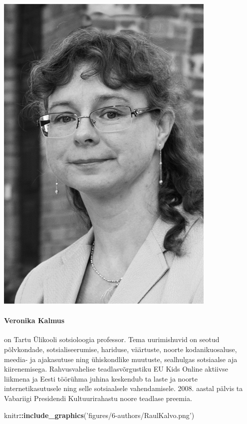 \documentclass[estonian,]{article}
\newenvironment{Shaded}{\begin{snugshade}}{\end{snugshade}}
\newcommand{\KeywordTok}[1]{\textcolor[rgb]{0.13,0.29,0.53}{\textbf{#1}}}
\newcommand{\NormalTok}[1]{#1}
\newcommand{\OperatorTok}[1]{\textcolor[rgb]{0.81,0.36,0.00}{\textbf{#1}}}
\newcommand{\StringTok}[1]{\textcolor[rgb]{0.31,0.60,0.02}{#1}}
\let\oldparagraph\paragraph
\renewcommand{\paragraph}[1]{\oldparagraph{#1}\mbox{}}
\begin{document}
\begin{flushleft}\includegraphics[width=0.5\linewidth]{figures/6-authors/VeronikaKalmus} \end{flushleft}

\hypertarget{veronika-kalmus}{%
\paragraph{Veronika Kalmus}\label{veronika-kalmus}}

on Tartu Ülikooli sotsioloogia professor. Tema uurimishuvid on seotud põlvkondade, sotsialiseerumise, hariduse, väärtuste, noorte kodanikuosaluse, meedia- ja ajakasutuse ning ühiskondlike muutuste, sealhulgas sotsiaalse aja kiirenemisega. Rahvusvahelise teadlasvõrgustiku EU Kids Online aktiivse liikmena ja Eesti töörühma juhina keskendub ta laste ja noorte internetikasutusele ning selle sotsiaalsele vahendamisele. 2008. aastal pälvis ta Vabariigi Presidendi Kultuurirahastu noore teadlase preemia.

\begin{Shaded}
\begin{Highlighting}[]
\NormalTok{knitr}\OperatorTok{::}\KeywordTok{include_graphics}\NormalTok{(}\StringTok{'figures/6-authors/RaulKalvo.png'}\NormalTok{)}
\end{Highlighting}
\end{Shaded}
\end{document}
